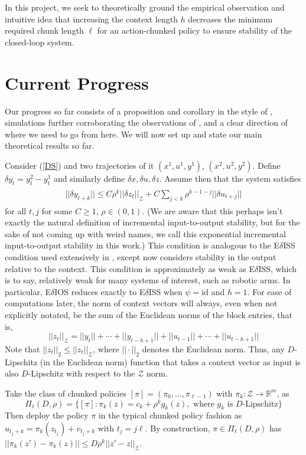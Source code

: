 \documentclass{l4dc2026}
\newcommand{\lm}{\limits}
\newcommand{\cd}{\cdot}
\newcommand{\R}{\mathbb{R}}
\newcommand{\eqspnoan}[2]{\begin{align}\tag{#1}\begin{split} #2 \end{split}\end{align}}
\begin{document}
In this project, we seek to theoretically ground the empirical observation and intuitive idea that increasing the context length $h$ decreases the minimum required chunk length $\ell$ for an action-chunked policy to ensure stability of the closed-loop system.

\section{Current Progress}
Our progress so far consists of a proposition and corollary in the style of \cite{zhang2025actionchunkingexploratorydata}, simulations further corroborating the observations of \cite{block2023provable}, and a clear direction of where we need to go from here. We will now set up and state our main theoretical results so far.

Consider (\ref{DS}) and two trajectories of it $(x^1, u^1, y^1)$, $(x^2, u^2, y^2)$. Define $\delta y_t = y^2_t - y^1_t$ and similarly define $\delta x, \delta u, \delta z$. Assume then that the system satisfies \eqspnoan{E$\delta$IOS}{||\delta y_{t+k}|| \le C\rho^k||\delta z_t||_\mathcal{Z} + C\sum\lm_{j < k}\rho^{k - 1 - j}||\delta u_{t + j}||}
for all $t, j$ for some $C \ge 1$, $\rho \in (0, 1)$. (We are aware that this perhaps isn't exactly the natural definition of incremental input-to-output stability, but for the sake of not coming up with weird names, we call this exponential incremental input-to-output stability in this work.) This condition is analogous to the E$\delta$ISS condition used extensively in \cite{zhang2025actionchunkingexploratorydata}, except now considers stability in the output relative to the context. This condition is approximately as weak as E$\delta$ISS, which is to say, relatively weak for many systems of interest, such as robotic arms. In particular, E$\delta$IOS reduces exactly to E$\delta$ISS when $\psi = \text{id}$ and $h = 1$. For ease of computations later, the norm of context vectors will always, even when not explicitly notated, be the sum of the Euclidean norms of the block entries, that is, \[||z_t||_\mathcal{Z} = ||y_t|| + \cdots + ||y_{t - h + 1}|| + ||u_{t-1}|| + \cdots + ||u_{t-  h + 1}||\]
Note that $||z_t||_2 \le ||z_t||_\mathcal{Z}$, where $||\cd||_2$ denotes the Euclidean norm. Thus, any $D$-Lipschitz (in the Euclidean norm) function that takes a context vector as input is also $D$-Lipschitz with respect to the $\mathcal{Z}$ norm.

Take the class of chunked policies $[\pi] = (\pi_0, ..., \pi_{\ell - 1})$ with $\pi_k: \mathcal{Z} \to \R^m$, as \[\Pi_{\ell}(D, \rho) = \{[\pi] : \pi_k(z) = c_k + \rho^kg_k(z), \text{ where } g_k \text{ is $D$-Lipschitz}\}\]
Then deploy the policy $\pi$ in the typical chunked policy fashion as $u_{t_j + k} = \pi_k(z_{t_j}) + v_{t_j + k}$ with $t_j = j\ell$. By construction, $\pi \in \Pi_\ell(D, \rho)$ has $||\pi_k(z') - \pi_k(z)|| \le D\rho^k||z' - z||_\mathcal{Z}$. 
\end{document}
